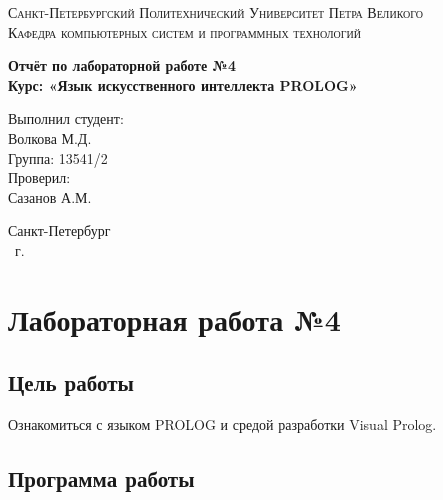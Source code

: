\documentclass[14pt,a4paper,report]{report}
\begin{document}
\def\contentsname{Содержание}

\begin{titlepage}
	\begin{center}
		\textsc{Санкт-Петербургский Политехнический 
			Университет Петра Великого\\[5mm]
			Кафедра компьютерных систем и программных технологий}
		
		\vfill
		
		\textbf{Отчёт по лабораторной работе №4\\[3mm]
			Курс: «Язык искусственного интеллекта PROLOG»\\[41mm]
		}
	\end{center}
	
	\hfill
	\begin{minipage}{.4\textwidth}
		Выполнил студент:\\[2mm] 
		Волкова М.Д.\\
		Группа: 13541/2\\[5mm]
		
		Проверил:\\[2mm] 
		Сазанов А.М.
	\end{minipage}
	\vfill
	\begin{center}
		Санкт-Петербург\\ \the\year\ г.
	\end{center}
\end{titlepage}

\tableofcontents
\clearpage

\chapter{Лабораторная работа №4}

\section{Цель работы}

Ознакомиться с языком PROLOG и средой разработки Visual Prolog.

\section{Программа работы}
\end{document}
